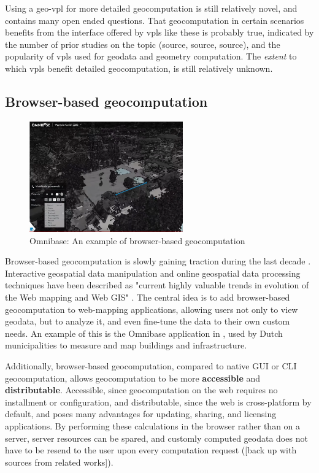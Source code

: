Using a \ac{geo-vpl} for more detailed geocomputation is still relatively novel, and contains many open ended questions. That geocomputation in certain scenarios benefits from the interface offered by \ac{vpl}s like these is probably true, indicated by the number of prior studies on the topic (source, source, source), and the popularity of \ac{vpl}s used for geodata and geometry computation. The \emph{extent} to which \ac{vpl}s benefit detailed geocomputation, is still relatively unknown. 

\subsection*{Browser-based geocomputation}

\begin{figure}
  \centering
  \graphicspath{ {../../assets/images/background/geo-web/} }
  \includegraphics[width=250px]{omnibase.png}
  \caption{Omnibase: An example of browser-based geocomputation}
  \label{fig:1:omnibase}
\end{figure}

Browser-based \ac{geocomputation} is slowly gaining traction during the last decade \cite{kulawiak_analysis_2019, panidi_hybrid_2015, hamilton_client-side_2014}. 
Interactive geospatial data manipulation and online geospatial data processing techniques have been described as "current highly valuable trends in evolution of the Web mapping and Web GIS" \cite{panidi_hybrid_2015}. 
The central idea is to add browser-based geocomputation to web-mapping applications, allowing users not only to view geodata, but to analyze it, and even fine-tune the data to their own custom needs.
An example of this is the Omnibase application in , used by Dutch municipalities to measure and map buildings and infrastructure.

Additionally, browser-based geocomputation, compared to native GUI or CLI geocomputation, allows geocomputation to be more \textbf{accessible} and \textbf{distributable}. 
Accessible, since geocomputation on the web requires no installment or configuration, 
and distributable, since the web is cross-platform by default, and poses many advantages for updating, sharing, and licensing applications. 
By performing these calculations in the browser rather than on a server, server resources can be spared, and customly computed geodata does not have to be resend to the user upon every computation request ([back up with sources from related works]).

